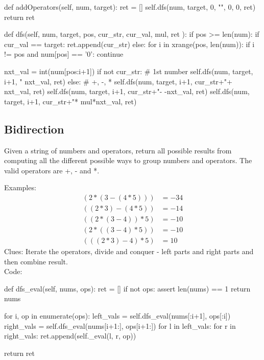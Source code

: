 \begin{python}
def addOperators(self, num, target):
  ret = []
  self.dfs(num, target, 0, "", 0, 0, ret)
  return ret

def dfs(self, num, target, pos, 
        cur_str, cur_val, 
        mul, ret
):
  if pos >= len(num):
    if cur_val == target:
      ret.append(cur_str)
  else:
    for i in xrange(pos, len(num)):
      if i != pos and num[pos] == '0':
        continue
        
      nxt_val = int(num[pos:i+1])
      if not cur_str:  # 1st number
        self.dfs(num, target, i+1, 
            "%
            nxt_val, ret)
      else:  # +, -, *
        self.dfs(num, target, i+1, 
            cur_str+"+%
            nxt_val, ret)
        self.dfs(num, target, i+1, 
            cur_str+"-%
            -nxt_val, ret)
        self.dfs(num, target, i+1, 
    cur_str+"*%
            mul*nxt_val, ret)
\end{python}
\subsection{Bidirection}
 Given a string of numbers and operators, return all possible
results from computing all the different possible ways to group numbers and operators.
The valid operators are +, - and *.

Examples:
\begin{align*}
(2*(3-(4*5))) &= -34 \\
((2*3)-(4*5)) &= -14 \\
((2*(3-4))*5) &= -10 \\
(2*((3-4)*5)) &= -10 \\
(((2*3)-4)*5) &= 10
\end{align*}
Clues: Iterate the operators, divide and conquer - left parts and right parts and then
combine result. \\
Code:
\begin{python}
def dfs_eval(self, nums, ops):
  ret = []
  if not ops:
    assert len(nums) == 1
    return nums

  for i, op in enumerate(ops):
    left_vals = self.dfs_eval(nums[:i+1], ops[:i])
    right_vals = self.dfs_eval(nums[i+1:], ops[i+1:])
    for l in left_vals:
      for r in right_vals:
        ret.append(self._eval(l, r, op))

  return ret
\end{python}
